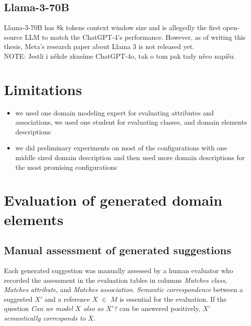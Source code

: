 \subsection{Llama-3-70B}
Llama-3-70B has 8k tokens context window size and is allegedly  the first open-source LLM to match the ChatGPT-4's performance. However, as of writing this thesis, Meta's research paper about Llama 3 is not released yet. \\

NOTE: Jestli i někde zkusíme ChatGPT-4o, tak o tom pak tady něco napíšu.


\section{Limitations}
\begin{itemize}
\item we used one domain modeling expert for evaluating attributes and associations, we used one student for evaluating classes, and domain elements descriptions
\item we did preliminary experiments on most of the configurations with one middle sized domain description and then used more domain descriptions for the most promising configurations
\end{itemize}


\section{Evaluation of generated domain elements}


\subsection{Manual assessment of generated suggestions}

Each generated suggestion was manually assessed by a human evaluator who recorded the assessment in the evaluation tables in columns \emph{Matches class}, \emph{Matches attribute}, and \emph{Matches association}.
\emph{Semantic correspondence} between a suggested $X'$ and a reference $X$ $\in$ $M$ is essential for the evaluation.
If the question \emph{Can we model $X$ also as $X'$?} can be answered positively, $X'$ \emph{semantically corresponds to} $X$.

